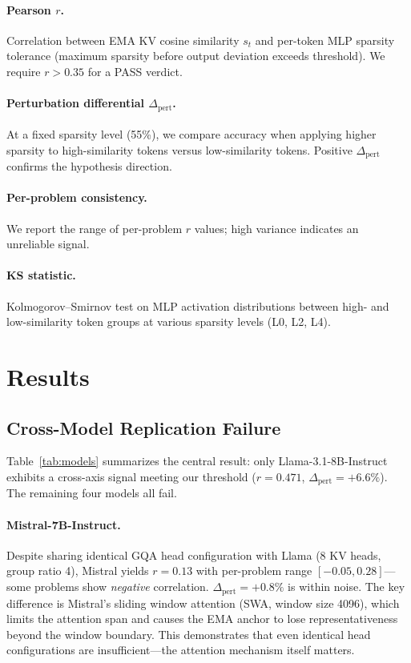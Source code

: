 \documentclass[11pt]{article}
\begin{document}
\paragraph{Pearson $r$.} Correlation between EMA KV cosine similarity $s_t$ and per-token MLP sparsity tolerance (maximum sparsity before output deviation exceeds threshold). We require $r > 0.35$ for a PASS verdict.

\paragraph{Perturbation differential $\Delta_\text{pert}$.} At a fixed sparsity level (55\%), we compare accuracy when applying higher sparsity to high-similarity tokens versus low-similarity tokens. Positive $\Delta_\text{pert}$ confirms the hypothesis direction.

\paragraph{Per-problem consistency.} We report the range of per-problem $r$ values; high variance indicates an unreliable signal.

\paragraph{KS statistic.} Kolmogorov--Smirnov test on MLP activation distributions between high- and low-similarity token groups at various sparsity levels (L0, L2, L4).

\section{Results}

\subsection{Cross-Model Replication Failure}

Table~\ref{tab:models} summarizes the central result: only Llama-3.1-8B-Instruct exhibits a cross-axis signal meeting our threshold ($r{=}0.471$, $\Delta_\text{pert}{=}{+}6.6\%$). The remaining four models all fail.

\paragraph{Mistral-7B-Instruct.} Despite sharing identical GQA head configuration with Llama (8 KV heads, group ratio 4), Mistral yields $r{=}0.13$ with per-problem range $[-0.05, 0.28]$---some problems show \emph{negative} correlation. $\Delta_\text{pert}{=}{+}0.8\%$ is within noise. The key difference is Mistral's sliding window attention (SWA, window size 4096), which limits the attention span and causes the EMA anchor to lose representativeness beyond the window boundary. This demonstrates that even identical head configurations are insufficient---the attention mechanism itself matters.
\end{document}
